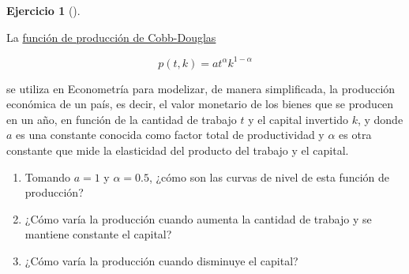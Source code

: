 \documentclass[
  spanish,
  a4paper,
]{scrreport}
\theoremstyle{definition}
\newtheorem{exercise}{Ejercicio}[chapter]
\theoremstyle{remark}
\begin{document}
\begin{exercise}[]\protect\hypertarget{exr-produccion-economica}{}\label{exr-produccion-economica}

La
\href{https://es.wikipedia.org/wiki/Funci\%C3\%B3n_de_producci\%C3\%B3n_de_Cobb-Douglas}{función
de producción de Cobb-Douglas}

\[p(t,k) = at^\alpha k^{1-\alpha }\]

se utiliza en Econometría para modelizar, de manera simplificada, la
producción económica de un país, es decir, el valor monetario de los
bienes que se producen en un año, en función de la cantidad de trabajo
\(t\) y el capital invertido \(k\), y donde \(a\) es una constante
conocida como factor total de productividad y \(\alpha\) es otra
constante que mide la elasticidad del producto del trabajo y el capital.

\begin{enumerate}
\def\labelenumi{\alph{enumi}.}
\item
  Tomando \(a=1\) y \(\alpha=0.5\), ¿cómo son las curvas de nivel de
  esta función de producción?
\item
  ¿Cómo varía la producción cuando aumenta la cantidad de trabajo y se
  mantiene constante el capital?
\item
  ¿Cómo varía la producción cuando disminuye el capital?
\end{enumerate}

\end{exercise}
\end{document}
